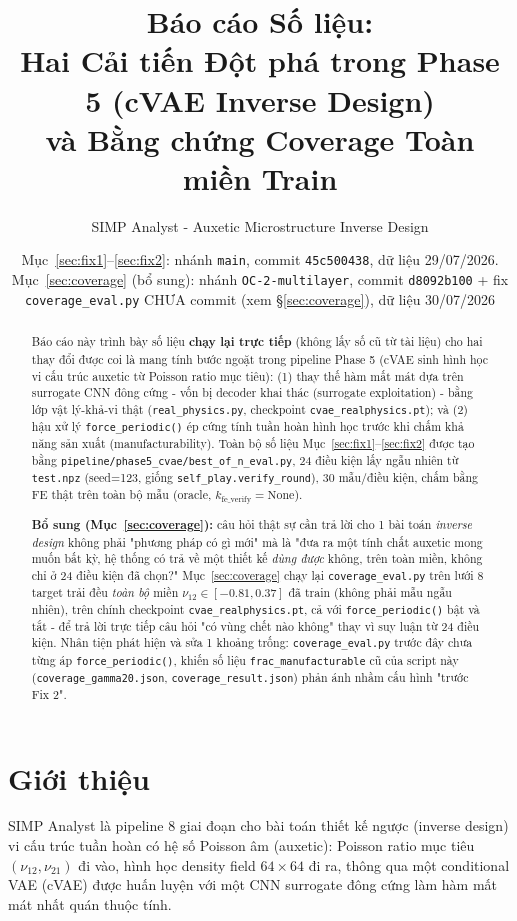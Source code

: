 \documentclass[11pt,a4paper]{article}
\title{\textbf{Báo cáo Số liệu:\\Hai Cải tiến Đột phá trong Phase 5 (cVAE Inverse Design)\\
\large và Bằng chứng Coverage Toàn miền Train}}
\author{SIMP Analyst - Auxetic Microstructure Inverse Design}
\date{Mục~\ref{sec:fix1}--\ref{sec:fix2}: nhánh \texttt{main}, commit \texttt{45c500438}, dữ liệu
29/07/2026. Mục~\ref{sec:coverage} (bổ sung): nhánh \texttt{OC-2-multilayer}, commit
\texttt{d8092b100} + fix \texttt{coverage\_eval.py} CHƯA commit (xem \S\ref{sec:coverage}), dữ
liệu 30/07/2026}
\begin{document}
\maketitle
\thispagestyle{fancy}

\begin{abstract}
\noindent
Báo cáo này trình bày số liệu \textbf{chạy lại trực tiếp} (không lấy số cũ từ tài liệu) cho hai
thay đổi được coi là mang tính bước ngoặt trong pipeline Phase 5 (cVAE sinh hình học vi cấu trúc
auxetic từ Poisson ratio mục tiêu): (1) thay thế hàm mất mát dựa trên surrogate CNN đông cứng -
vốn bị decoder khai thác (surrogate exploitation) - bằng lớp vật lý-khả-vi thật
(\texttt{real\_physics.py}, checkpoint \texttt{cvae\_realphysics.pt}); và (2) hậu xử lý
\texttt{force\_periodic()} ép cứng tính tuần hoàn hình học trước khi chấm khả năng sản xuất
(manufacturability). Toàn bộ số liệu Mục~\ref{sec:fix1}--\ref{sec:fix2} được tạo bằng
\texttt{pipeline/phase5\_cvae/best\_of\_n\_eval.py}, 24 điều kiện lấy ngẫu nhiên từ
\texttt{test.npz} (seed=123, giống \texttt{self\_play.verify\_round}), 30 mẫu/điều kiện, chấm
bằng FE thật trên toàn bộ mẫu (oracle, $k_{\text{fe\_verify}}=\text{None}$).

\noindent\textbf{Bổ sung (Mục~\ref{sec:coverage}):} câu hỏi thật sự cần trả lời cho 1 bài toán
\emph{inverse design} không phải "phương pháp có gì mới" mà là "đưa ra một tính chất auxetic mong
muốn bất kỳ, hệ thống có trả về một thiết kế \emph{dùng được} không, trên toàn miền, không chỉ ở
24 điều kiện đã chọn?" Mục~\ref{sec:coverage} chạy lại \texttt{coverage\_eval.py} trên lưới 8
target trải đều \emph{toàn bộ} miền $\nu_{12}\in[-0.81,0.37]$ đã train (không phải mẫu ngẫu
nhiên), trên chính checkpoint \texttt{cvae\_realphysics.pt}, cả với \texttt{force\_periodic()}
bật và tắt - để trả lời trực tiếp câu hỏi "có vùng chết nào không" thay vì suy luận từ 24 điều
kiện. Nhân tiện phát hiện và sửa 1 khoảng trống: \texttt{coverage\_eval.py} trước đây chưa từng áp
\texttt{force\_periodic()}, khiến số liệu \texttt{frac\_manufacturable} cũ của script này
(\texttt{coverage\_gamma20.json}, \texttt{coverage\_result.json}) phản ánh nhầm cấu hình
"trước Fix 2".
\end{abstract}

\tableofcontents

\section{Giới thiệu}
SIMP Analyst là pipeline 8 giai đoạn cho bài toán thiết kế ngược (inverse design) vi cấu trúc
tuần hoàn có hệ số Poisson âm (auxetic): Poisson ratio mục tiêu $(\nu_{12},\nu_{21})$ đi vào,
hình học density field $64\times64$ đi ra, thông qua một conditional VAE (cVAE) được huấn luyện
với một CNN surrogate đông cứng làm hàm mất mát nhất quán thuộc tính.
\end{document}
